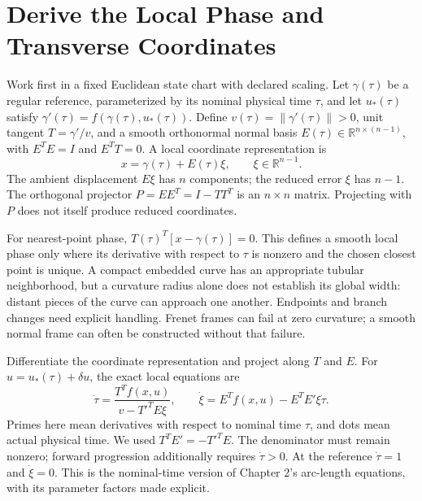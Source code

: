 \section{Derive the Local Phase and Transverse Coordinates}

Work first in a fixed Euclidean state chart with declared scaling. Let
$\gamma(\tau)$ be a regular reference, parameterized by its nominal physical
time $\tau$, and let $u_*(\tau)$ satisfy
$\gamma'(\tau)=f(\gamma(\tau),u_*(\tau))$. Define
$v(\tau)=\|\gamma'(\tau)\|>0$, unit tangent $T=\gamma'/v$, and a smooth
orthonormal normal basis $E(\tau)\in\mathbb R^{n\times(n-1)}$, with
$E^TE=I$ and $E^TT=0$. A local coordinate representation is
\begin{equation}\label{eq:decomposition}
 x=\gamma(\tau)+E(\tau)\xi,\qquad \xi\in\mathbb R^{n-1}.
\end{equation}
The ambient displacement $E\xi$ has $n$ components; the reduced error $\xi$
has $n-1$. The orthogonal projector $P=EE^T=I-TT^T$ is an $n\times n$
matrix. Projecting with $P$ does not itself produce reduced coordinates.

For nearest-point phase, $T(\tau)^T[x-\gamma(\tau)]=0$. This defines a smooth
local phase only where its derivative with respect to $\tau$ is nonzero and
the chosen closest point is unique. A compact embedded curve has an appropriate
tubular neighborhood, but a curvature radius alone does not establish its
global width: distant pieces of the curve can approach one another. Endpoints
and branch changes need explicit handling. Frenet frames can fail at zero
curvature; a smooth normal frame can often be constructed without that failure.

Differentiate the coordinate representation and project along $T$ and $E$.
For $u=u_*(\tau)+\delta u$, the exact local equations are
\begin{equation}\label{eq:orbital_exact_transverse}
 \dot\tau=\frac{T^Tf(x,u)}{v-T'^TE\xi},\qquad
 \dot\xi=E^Tf(x,u)-E^TE'\xi\dot\tau.
\end{equation}
Primes here mean derivatives with respect to nominal time $\tau$, and dots
mean actual physical time. We used $T^TE'=-T'^TE$. The denominator must remain
nonzero; forward progression additionally requires $\dot\tau>0$. At the
reference $\dot\tau=1$ and $\dot\xi=0$. This is the nominal-time version of
Chapter 2's arc-length equations, with its parameter factors made explicit.

